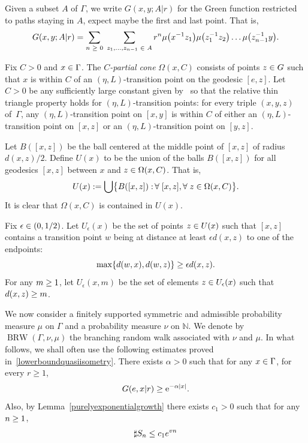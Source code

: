 \documentclass[10pt]{amsart}
\theoremstyle{definition}\newtheorem{defi}[theo]{Definition}\newtheorem{rema}[theo]{Remark}\newtheorem{exam}[theo]{Example}\newtheorem{exem}[theo]{Example}\newtheorem{nota}[theo]{Notation}
\newcommand\bbN{\mathbb{N}}
\newcommand{\rme}{\mathrm{e}}
\DeclareMathOperator{\BRW}{BRW}
\let\originalleft\left
\let\originalright\right
\renewcommand{\left}{\mathopen{}\mathclose\bgroup\originalleft}
\renewcommand{\right}{\aftergroup\egroup\originalright}
\let\oldin\in
\renewcommand{\in}{\mathchoice{\oldin}{\oldin}{\,\oldin\,}{\,\oldin\,}}
\let\oldge\ge
\renewcommand{\ge}{\mathchoice{\oldge}{\oldge}{\,\oldge\,}{\,\oldge\,}}
\let\oldle\le
\renewcommand{\le}{\mathchoice{\oldle}{\oldle}{\,\oldle\,}{\,\oldle\,}}
\let\oldforall\forall
\renewcommand*{\forall}{\mathrel{\oldforall}}
\begin{document}
Given a subset $A$ of $\Gamma$, we write $G(x,y;A|r)$ for the Green function restricted to paths staying in $A$, expect maybe the first and last point. That is,
\[
G(x,y;A|r)=\sum_{n\ge 0}\;\sum_{z_1,\dots,z_{n-1}\in A}r^n\mu\left(x^{-1}z_1\right)\mu\left(z_1^{-1}z_2\right)\dots\mu\left(z_{n-1}^{-1}y\right).
\]

Fix $C>0$ and $x\in \Gamma$. The \emph{$C$-partial cone} $\Omega(x,C)$ consists of points $z\in G$ such that $x$ is within $C$ of an $(\eta, L)$-transition point on the geodesic $[e,z]$. Let $C>0$ be any sufficiently large constant given by~\cite[Lemma~2.9]{DWY} so that the relative thin triangle property holds for $(\eta, L)$-transition points: for every triple $(x,y,z)$ of~$\Gamma$, any $(\eta,L)$-transition point on $[x,y]$ is within $C$ of either an $(\eta,L)$-transition point on $[x,z]$ or an $(\eta,L)$-transition point on $[y,z]$.

Let $B([x,z])$ be the ball centered at the middle point of $[x,z]$ of radius ${d(x,z)/2}$. Define $U(x)$ to be the union of the balls $B([x,z])$ for all geodesics $[x,z]$ between $x$ and $z\in \Omega(x,C)$. That is,
\[
U(x):= \bigcup\bigl\{B([x,z]):\, \forall [x,z], \forall z\in \Omega(x,C)\bigr\}.
\]
It is clear that $\Omega(x, C)$ is contained in $U(x)$.

Fix $\epsilon\in (0, 1/2)$.
Let $U_\epsilon(x)$ be the set of points $z\in U(x)$ such that $[x,z]$ contains a transition point $w$ being at distance at least $\epsilon d(x,z)$ to one of the endpoints:
\[
\max\{d(w, x), d(w,z)\}\ge \epsilon d(x,z).
\]
For any $m\ge 1$, let $U_{\epsilon}(x,m)$ be the set of elements $z\in U_{\epsilon}(x)$ such that $d(x,z)\ge m$.


We now consider a finitely supported symmetric and admissible probability measure $\mu$ on $\Gamma$ and a probability measure $\nu$ on $\bbN$. We denote by $\BRW(\Gamma,\nu,\mu)$ the branching random walk associated with $\nu$ and $\mu$. In what follows, we shall often use the following estimates proved in~\eqref{lowerboundquasiisometry}. There exists $\alpha>0$ such that for any $x\in \Gamma$, for every $r\geq 1$,
\begin{align}\label{GrLBD}
G(e, x|r)\ge \rme^{-\alpha |x|}.
\end{align}
Also, by Lemma~\ref{purelyexponentialgrowth} there exists $c_1>0$ such that for any $n\ge 1$,
\begin{align}\label{SnGrowth}
\sharp S_n\le c_1 e^{vn}
\end{align}
\end{document}
